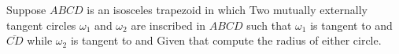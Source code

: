 Suppose $ABCD$ is an isosceles trapezoid in which   Two mutually externally tangent circles $\omega_1$ and $\omega_2$ are inscribed in $ABCD$ such that $\omega_1$ is tangent to  and $\overline{CD}$ while $\omega_2$ is tangent to   and   Given that   compute the radius of either circle.